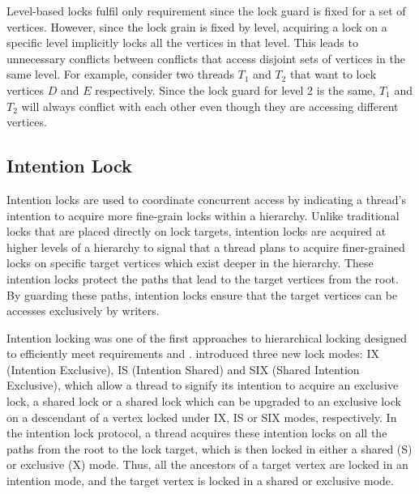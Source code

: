 Level-based locks fulfil only requirement \Ra since the lock guard is fixed for a set of vertices. 
However, since the lock grain is fixed by level, acquiring a lock on a specific level implicitly locks all the vertices in that level. This leads to unnecessary conflicts between conflicts that access disjoint sets of vertices in the same level. 
For example, consider two threads $T_1$ and $T_2$ that want to lock vertices $D$ and $E$ respectively.
Since the lock guard for level 2 is the same, $T_1$ and $T_2$ will always conflict with each other even though they are accessing different vertices. 



\subsection{Intention Lock}

Intention locks are used to coordinate concurrent access by indicating a thread’s intention to acquire more fine-grain locks within a hierarchy. Unlike traditional locks that are placed directly on lock targets, intention locks are acquired at higher levels of a hierarchy to signal that a thread plans to acquire finer-grained locks on specific target vertices which exist deeper in the hierarchy. These intention locks protect the paths that lead to the target vertices from the root. By guarding these paths, intention locks ensure that the target vertices can be accesses exclusively by writers.

Intention locking was one of the first approaches to hierarchical locking designed to efficiently meet requirements \Ra and \Rc. \citet{gray1975granularity} introduced three new lock modes: IX (Intention Exclusive), IS (Intention Shared) and SIX (Shared Intention Exclusive), which allow a thread to signify its intention to acquire an exclusive lock, a shared lock or a shared lock which can be upgraded to an exclusive lock on a descendant of a vertex locked under IX, IS or SIX modes, respectively. In the intention lock protocol, a thread acquires these intention locks on all the paths from the root to the lock target, which is then locked in either a shared (S) or exclusive (X) mode. Thus, all the ancestors of a target vertex are locked in an intention mode, and the target vertex is locked in a shared or exclusive mode.

